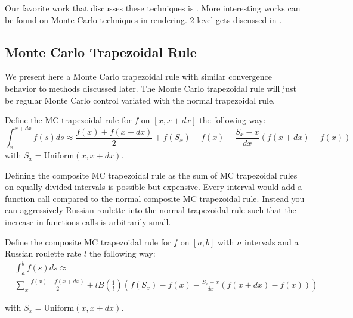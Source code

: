 \documentclass[a4paper,12pt]{article}
\begin{document}
\vspace*{0.2cm}
\begin{pythonn}
\end{pythonn}

\begin{comment}
Introduces Russian roulette, splitting, control variates, importance sampling and maybe quasi Monte Carlo with the
$y'=y$ example. We are missing importance sampling and quasi MC
\end{comment}

\begin{related}
    Our favorite work that discusses these techniques is \cite{veach_robust_nodate}.
    More interesting works can be found on Monte Carlo techniques in rendering.
    $2$-level gets discussed in \cite{giles_multilevel_2013}.
\end{related}

\subsection{Monte Carlo Trapezoidal Rule}
We present here a Monte Carlo trapezoidal rule with similar convergence behavior to
methods discussed later. The Monte Carlo trapezoidal rule will just be
regular Monte Carlo control variated with the normal trapezoidal rule.

\begin{definition}
    Define the MC trapezoidal rule for $f$ on $[x,x+dx]$ the following
    way:
    \begin{equation}
        \int_{x}^{x+dx} f(s)ds \approx
        \frac{f(x)+f(x+dx)}{2} + f(S_{x})-f(x)-\frac{S_{x}-x}{dx}(f(x+dx)-f(x))
    \end{equation}
    with $S_{x} = \text{Uniform}(x,x+dx)$.
\end{definition}


Defining the composite MC trapezoidal rule as
the sum of MC trapezoidal rules on equally divided intervals
is possible but expensive. Every interval would add a function call
compared to the normal composite MC trapezoidal rule. Instead
you can aggressively Russian roulette into the normal trapezoidal rule
such that the increase in functions calls is arbitrarily small.

\begin{definition} \label{MCtrap}
    Define the composite MC trapezoidal rule for $f$ on $[a,b]$ with
    $n$ intervals and a Russian roulette rate $l$ the following way:
    \begin{align}
         & \int_{a}^{b} f(s)ds \approx        \\
         & \sum_{x}  \frac{f(x)+f(x+dx)}{2} +
        l B \left(\frac{1}{l} \right)
        \left(f(S_{x})-f(x)-\frac{S_{x}-x}{dx}(f(x+dx)-f(x)) \right)
    \end{align}

    with $S_{x} = \text{Uniform}(x,x+dx)$.

\end{definition}
\end{document}
